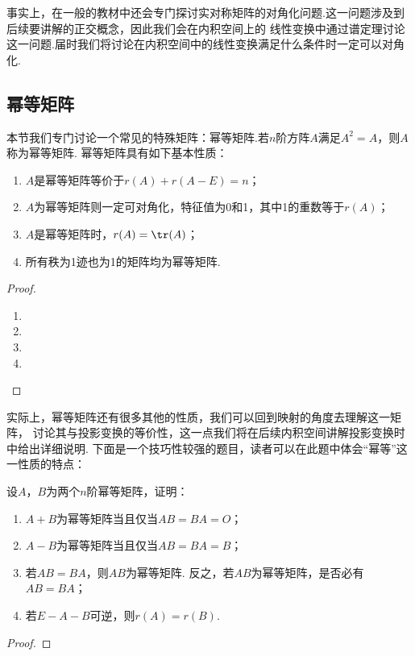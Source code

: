 事实上，在一般的教材中还会专门探讨实对称矩阵的对角化问题.这一问题涉及到后续要讲解的正交概念，因此我们会在内积空间上的
线性变换中通过谱定理讨论这一问题.届时我们将讨论在内积空间中的线性变换满足什么条件时一定可以对角化.

\subsection{幂等矩阵}
本节我们专门讨论一个常见的特殊矩阵：幂等矩阵.若$n$阶方阵$A$满足$A^2=A$，则$A$称为幂等矩阵.
幂等矩阵具有如下基本性质：
\begin{enumerate}[label=(\arabic*)]
    \item $A$是幂等矩阵等价于$r(A)+r(A-E)=n$；

    \item $A$为幂等矩阵则一定可对角化，特征值为0和1，其中1的重数等于$r(A)$；

    \item $A$是幂等矩阵时，$r(A)=\tr(A)$；

    \item 所有秩为1迹也为1的矩阵均为幂等矩阵.
\end{enumerate}
\begin{proof}
    \begin{enumerate}[label=(\arabic*)]
        \item 
        \item 
        \item 
        \item 
    \end{enumerate}
\end{proof}

实际上，幂等矩阵还有很多其他的性质，我们可以回到映射的角度去理解这一矩阵，
讨论其与投影变换的等价性，这一点我们将在后续内积空间讲解投影变换时中给出详细说明.
下面是一个技巧性较强的题目，读者可以在此题中体会``幂等''这一性质的特点：
\begin{example}
    设$A$，$B$为两个$n$阶幂等矩阵，证明：
    \begin{enumerate}
        \item $A+B$为幂等矩阵当且仅当$AB=BA=O$；

        \item $A-B$为幂等矩阵当且仅当$AB=BA=B$；

        \item 若$AB=BA$，则$AB$为幂等矩阵. 反之，若$AB$为幂等矩阵，是否必有$AB=BA$；

        \item 若$E-A-B$可逆，则$r(A)=r(B)$.
    \end{enumerate}
\end{example}
\begin{proof}
    
\end{proof}

